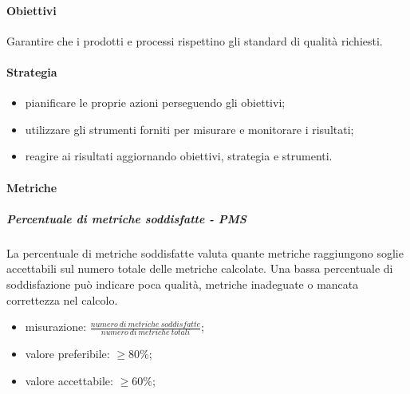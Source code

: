 		\paragraph{Obiettivi}
		Garantire che i prodotti e processi rispettino gli standard di qualità richiesti.
		\paragraph{Strategia}
		\begin{itemize}
			\item pianificare le proprie azioni perseguendo gli obiettivi;
			\item utilizzare gli strumenti forniti per misurare e monitorare i risultati;
			\item reagire ai risultati aggiornando obiettivi, strategia e strumenti.
		\end{itemize}
		\paragraph{Metriche}
			\subparagraph{Percentuale di metriche soddisfatte - PMS}
			La percentuale di metriche soddisfatte valuta quante metriche raggiungono soglie accettabili sul numero totale delle metriche calcolate. Una bassa percentuale di soddisfazione può indicare poca qualità, metriche inadeguate o mancata correttezza nel calcolo.
			\begin{itemize}
				\item misurazione: $\frac{numero\ di\ metriche\ soddisfatte}{numero\ di\ metriche\ totali} $;
				\item valore preferibile: $ \geq 80\%$;
				\item valore accettabile: $ \geq 60\%$;
			\end{itemize}
		